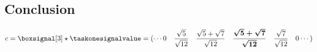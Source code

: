 \documentclass[a4paper]{article}
\theoremstyle{break}
\theoremstyle{break}
\begin{document}
\subsection*{Conclusion}

\begin{equation*}
  \begin{split}
    c = \boxsignal[3] \star \taskonesignalvalue = (\cdots 0 \quad \frac{\sqrt{5}}{\sqrt{12}} \quad \frac{\sqrt{5} + \sqrt{7}}{\sqrt{12}} \quad \boldsymbol{\frac{\sqrt{5} + \sqrt{7}}{\sqrt{12}}} \quad \frac{\sqrt{7}}{\sqrt{12}} \quad 0 \cdots)
  \end{split}
\end{equation*}
\end{document}
